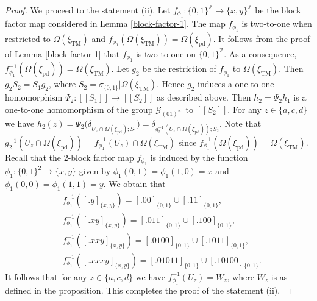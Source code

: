 \documentclass[12pt]{article}
\theoremstyle{definition}
\def\bZ{\mathbb{Z}}
\def\cG{\mathcal{G}}
\def\de{\delta}
\def\si{\sigma}
\def\Om{\Omega}
\def\xiTM{\xi_{\mathrm{TM}}}
\def\xipd{\xi_{\mathrm{pd}}}
\begin{document}
\begin{proof}
We proceed to the statement (ii).  Let 
$f_{\phi_1}:\{0,1\}^{\bZ}\to\{x,y\}^{\bZ}$ be the block factor map 
considered in Lemma \ref{block-factor-1}.  The map $f_{\phi_1}$ is 
two-to-one when restricted to $\Om(\xiTM)$ and $f_{\phi_1}(\Om(\xiTM))= 
\Om(\xipd)$.  It follows from the proof of Lemma \ref{block-factor-1} that 
$f_{\phi_1}$ is two-to-one on $\{0,1\}^{\bZ}$.  As a consequence, 
$f_{\phi_1}^{-1}(\Om(\xipd))=\Om(\xiTM)$.  Let $g_2$ be the restriction of 
$f_{\phi_1}$ to $\Om(\xiTM)$.  Then $g_2S_2=S_1g_2$, where 
$S_2=\si_{\{0,1\}}|\Om(\xiTM)$.  Hence $g_2$ induces a one-to-one 
homomorphism $\Psi_2:[[S_1]]\to[[S_2]]$ as described above.  Then 
$h_2=\Psi_2h_1$ is a one-to-one homomorphism of the group 
$\cG_{(01)^\infty}$ to $[[S_2]]$.  For any $z\in\{a,c,d\}$ we have
$h_2(z)=\Psi_2\bigl(\de_{U_z\cap\Om(\xipd);S_1}\bigr)
=\de_{g_2^{-1}(U_z\cap\Om(\xipd));S_2}$.  Note that 
$g_2^{-1}(U_z\cap\Om(\xipd))=f_{\phi_1}^{-1}(U_z)\cap\Om(\xiTM)$ since 
$f_{\phi_1}^{-1}(\Om(\xipd))=\Om(\xiTM)$.  Recall that the $2$-block factor
map $f_{\phi_1}$ is induced by the function $\phi_1:\{0,1\}^2\to\{x,y\}$
given by $\phi_1(0,1)=\phi_1(1,0)=x$ and 
$\phi_1(0,0)=\phi_1(1,1)=y$.  We obtain that
\begin{align*}
&f_{\phi_1}^{-1}([.y]_{\{x,y\}}) = [.00]_{\{0,1\}}\cup [.11]_{\{0,1\}},\\
&f_{\phi_1}^{-1}([.xy]_{\{x,y\}}) = [.011]_{\{0,1\}}\cup 
[.100]_{\{0,1\}},\\
&f_{\phi_1}^{-1}([.xxy]_{\{x,y\}}) = [.0100]_{\{0,1\}}\cup
[.1011]_{\{0,1\}},\\
&f_{\phi_1}^{-1}([.xxxy]_{\{x,y\}}) = [.01011]_{\{0,1\}}\cup 
[.10100]_{\{0,1\}}.
\end{align*}
It follows that for any $z\in\{a,c,d\}$ we have $f_{\phi_1}^{-1}(U_z)=W_z$, 
where $W_z$ is as defined in the proposition.  This completes the proof of 
the statement (ii).
\end{proof}
\end{document}
